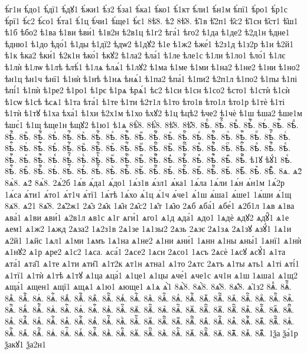 {ѣ́г1н
ѣ́до1
ѣ́дї1
ѣ́дꙋ1
ѣ́жи1
ѣ́з2
ѣ́за1
ѣ́ка1
ѣ́ко1
ѣ́1кт
ѣ́ли1
ѣ́н1м
ѣ́пї1
ѣ́ро1
ѣ́р1с
ѣ́рї1
ѣ́с2
ѣ́со1
ѣ́та1
ѣ́1ц
ѣ́чи1
ѣ́ще1
ѣ́є1
8ѣ̈8.
ѣ2̑
8ѣ̑8.
ѣ̑1в
ѣ̑2п1
ѣ̑с2
ѣ̑1сн
ѣ̑ст1
ѣ̑ш1
ѣ1б
ѣбо2
ѣ1ва
ѣ1ви
ѣви́1
ѣ1в2н
ѣ2в1ц
ѣ1г2
ѣга́1
ѣго2
ѣ1да
ѣ1де2
ѣ2д1н
ѣдне1
ѣдню1
ѣ1до
ѣдо́1
ѣ1ды
ѣ1дї2
ѣдѡ2
ѣ1дꙋ2
ѣ1е
ѣ1ж2
ѣже́1
ѣ2з1д
ѣ1з2р
ѣ1и
ѣ2й1
ѣ1к
ѣка2
ѣки́1
ѣ2к1н
ѣко́1
ѣкꙋ2
ѣ1ла2
ѣла́1
ѣ1ле
ѣле1с
ѣ1ли
ѣ1ло1
ѣло́1
ѣ1лє
ѣ1лѝ
ѣ1лѡ
ѣ1лѣ
ѣлѣ́1
ѣ1лѧ
ѣлѧ́1
ѣ1лꙋ2
ѣ1ма
ѣ1ме
ѣ1ми
ѣ1на2
ѣ1не2
ѣ1ни
ѣ1но2
ѣн1ц
ѣн1ч
ѣнї1
ѣ1нѝ
ѣ1нѣ
ѣ1нѧ
ѣнѧ́1
ѣ1па2
ѣпа́1
ѣ1пи2
ѣ2п1л
ѣ1по2
ѣ1пы
ѣ1пі
ѣпі́1
ѣ1пѝ
ѣ1ре2
ѣ1ро1
ѣ1рє
ѣ1рѧ
ѣрѧ́1
ѣс2
ѣ1си
ѣ1сн
ѣ1со2
ѣсто1
ѣ1стѝ
ѣ1сѝ
ѣ1сѡ
ѣ1сѣ
ѣсѧ1
ѣ1та
ѣта́1
ѣ1те
ѣ1ти
ѣ2т1л
ѣ1то
ѣто1в
ѣто1л
ѣто1р
ѣ1тѐ
ѣ1ті
ѣ1тѝ
ѣ1тꙋ
ѣ1ха
ѣха́1
ѣ1хи
ѣ2х1м
ѣ1хо
ѣхꙋ2
ѣ1ц
ѣцѣ2
ѣче2
ѣ1чѐ
ѣ1ш
ѣша2
ѣше1м
ѣшє́1
ѣ1щ
ѣще1н
ѣщꙋ2
ѣ1ю1
ѣ1ѧ
8ѣ҆̀8.
8ѣ҆́8.
8ѣ҆̈8.
8ѣ҆̑8.
8ѣⷠ.
8ѣⷠ҇.
8ѣⷡ.
8ѣⷡ҇.
8ѣⷢ.
8ѣⷢ҇.
8ѣⷣ.
8ѣⷣ҇.
8ѣⷤ.
8ѣⷤ҇.
8ѣⷥ.
8ѣⷥ҇.
8ѣⷦ.
8ѣⷦ҇.
8ѣⷧ.
8ѣⷧ҇.
8ѣⷨ.
8ѣⷨ҇.
8ѣⷩ.
8ѣⷩ҇.
8ѣⷪ.
8ѣⷪ҇.
8ѣⷫ.
8ѣⷫ҇.
8ѣⷬ.
8ѣⷬ҇.
8ѣⷭ.
8ѣⷭ҇.
8ѣⷮ.
8ѣⷮ҇.
8ѣⷯ.
8ѣⷯ҇.
8ѣⷰ.
8ѣⷰ҇.
8ѣⷱ.
8ѣⷱ҇.
8ѣⷲ.
8ѣⷲ҇.
8ѣⷳ.
8ѣⷳ҇.
8ѣⷴ.
8ѣⷴ҇.
8ѣⷵ.
8ѣⷵ҇.
8ѣⷶ.
8ѣⷶ҇.
8ѣⷷ.
8ѣⷷ҇.
8ѣⷸ.
8ѣⷸ҇.
8ѣⷹ.
8ѣⷹ҇.
8ѣⷺ.
8ѣⷺ҇.
8ѣⷻ.
8ѣⷻ҇.
8ѣⷼ.
8ѣⷼ҇.
8ѣⷽ.
8ѣⷽ҇.
8ѣⷾ.
8ѣⷾ҇.
8ѣⷿ.
8ѣⷿ҇.
ѣ1ꙋ
ѣꙋ́1
8ѣꙴ.
8ѣꙴ҇.
8ѣꙵ.
8ѣꙵ҇.
8ѣꙶ.
8ѣꙶ҇.
8ѣꙷ.
8ѣꙷ҇.
8ѣꙸ.
8ѣꙸ҇.
8ѣꙹ.
8ѣꙹ҇.
8ѣꙺ.
8ѣꙺ҇.
8ѣꙻ.
8ѣꙻ҇.
8ѣ꙼.
8ѣ꙼҇.
8ѣ꙽.
8ѣ꙽҇.
8ѧ.
ѧ2̀
8ѧ̀8.
ѧ2́
8ѧ́8.
2ѧ́2б
1ѧ́в
ѧ́да1
ѧ́до1
1ѧ́з1в
ѧ́зл1
ѧ́ка1
1ѧ́ла
1ѧ́ли
1ѧ́н
ѧ́н1м
1ѧ́2р
1ѧ́са
ѧ́ти1
ѧ́то1
ѧ́т1ч
ѧ́тї1
1ѧ́тѣ
1ѧ́хо
ѧ́1ц
ѧ́1ч
ѧ́че1
ѧ́1ш
ѧ́ша1
ѧ́ше1
1ѧ́ши
ѧ́1щ
8ѧ̈8.
ѧ2̑1
8ѧ̑8.
2ѧ̑2ж1
2ѧ̑з
2ѧ̑к
1ѧ̑н
2ѧ̑с2
1ѧ̑т
1ѧ̑ю
2ѧб
ѧба́1
ѧбе́1
ѧ2б1л
1ѧв
ѧ1ва
ѧва́1
ѧ1ви
ѧви́1
ѧ2в1л
ѧв1с
ѧ1г
ѧги́1
ѧго1
ѧ1д
ѧда́1
ѧдо1
1ѧдѐ
ѧдꙋ2
ѧдꙋ̑1
ѧ1е
ѧем1
ѧ1ж2
1ѧжд
2ѧза2
1ѧ2з1в
2ѧ1зе
1ѧ1зы2
2ѧзь
2ѧзє
2ѧ1зѧ
2ѧ1зꙋ
ѧзꙋ́1
1ѧ1и
ѧ2й1
1ѧйс
1ѧл1
ѧ1ми
1ѧмъ
1ѧ1на
ѧ1не2
ѧ1ни
ѧни́1
1ѧнн
ѧ1ны
ѧны́1
1ѧнї1
ѧ1нѝ
ѧ1нꙋ2
ѧ1р
ѧре2
ѧ1с2
1ѧса.
ѧса́1
2ѧсе2
1ѧсн
2ѧсо1
1ѧсъ
2ѧсѐ
1ѧсꙋ
ѧсꙋ́1
ѧ1та
ѧта́1
ѧта̑1
ѧ1те
ѧ1ти
ѧти̑1
ѧ1т2к
ѧт1н
ѧтна1
ѧ1то
2ѧтс
2ѧтъ
ѧ1ты
ѧть1
ѧ1ті
ѧті́1
ѧ1тї1
ѧ1тѝ
ѧ1тѣ
ѧ1тꙋ
ѧ1ца
ѧца́1
ѧ1це1
ѧ1цы
ѧче́1
ѧче1с
ѧч1н
ѧ1ш
1ѧша1
ѧ1щ2
ѧща́1
ѧщен1
ѧщї1
ѧщѧ1
ѧ1ю1
ѧюще1
ѧ1ѧ
ѧ҆̀1
8ѧ҆̀8.
8ѧ҆́8.
8ѧ҆̈8.
8ѧ҆̑8.
ѧ҆1з2
8ѧⷠ.
8ѧⷠ҇.
8ѧⷡ.
8ѧⷡ҇.
8ѧⷢ.
8ѧⷢ҇.
8ѧⷣ.
8ѧⷣ҇.
8ѧⷤ.
8ѧⷤ҇.
8ѧⷥ.
8ѧⷥ҇.
8ѧⷦ.
8ѧⷦ҇.
8ѧⷧ.
8ѧⷧ҇.
8ѧⷨ.
8ѧⷨ҇.
8ѧⷩ.
8ѧⷩ҇.
8ѧⷪ.
8ѧⷪ҇.
8ѧⷫ.
8ѧⷫ҇.
8ѧⷬ.
8ѧⷬ҇.
8ѧⷭ.
8ѧⷭ҇.
8ѧⷮ.
8ѧⷮ҇.
8ѧⷯ.
8ѧⷯ҇.
8ѧⷰ.
8ѧⷰ҇.
8ѧⷱ.
8ѧⷱ҇.
8ѧⷲ.
8ѧⷲ҇.
8ѧⷳ.
8ѧⷳ҇.
8ѧⷴ.
8ѧⷴ҇.
8ѧⷵ.
8ѧⷵ҇.
8ѧⷶ.
8ѧⷶ҇.
8ѧⷷ.
8ѧⷷ҇.
8ѧⷸ.
8ѧⷸ҇.
8ѧⷹ.
8ѧⷹ҇.
8ѧⷺ.
8ѧⷺ҇.
8ѧⷻ.
8ѧⷻ҇.
8ѧⷼ.
8ѧⷼ҇.
8ѧⷽ.
8ѧⷽ҇.
8ѧⷾ.
8ѧⷾ҇.
8ѧⷿ.
8ѧⷿ҇.
8ѧꙴ.
8ѧꙴ҇.
8ѧꙵ.
8ѧꙵ҇.
8ѧꙶ.
8ѧꙶ҇.
8ѧꙷ.
8ѧꙷ҇.
8ѧꙸ.
8ѧꙸ҇.
8ѧꙹ.
8ѧꙹ҇.
8ѧꙺ.
8ѧꙺ҇.
8ѧꙻ.
8ѧꙻ҇.
8ѧ꙼.
8ѧ꙼҇.
8ѧ꙽.
8ѧ꙽҇.
1ѯа
ѯа́1р
ѯакꙋ1
ѯа2н1
}
